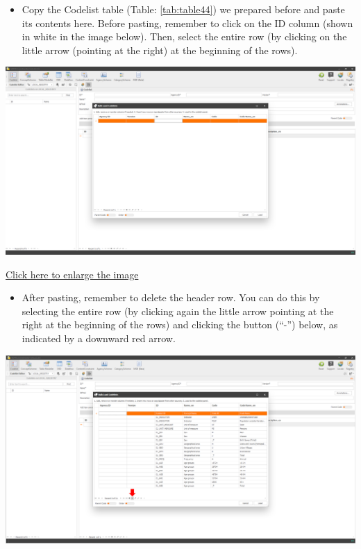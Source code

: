 \documentclass[
]{book}
\providecommand{\tightlist}{%
  \setlength{\itemsep}{0pt}\setlength{\parskip}{0pt}}
\begin{document}
\begin{itemize}
\tightlist
\item
  Copy the Codelist table (Table: \ref{tab:table44}) we prepared before and paste its contents here. Before pasting, remember to click on the ID column (shown in white in the image below). Then, select the entire row (by clicking on the little arrow (pointing at the right) at the beginning of the rows).
\end{itemize}

\begin{center}\includegraphics[width=1\linewidth]{./images/image088} \end{center}

\href{images/image088.png}{Click here to enlarge the image}

\begin{itemize}
\tightlist
\item
  After pasting, remember to delete the header row. You can do this by selecting the entire row (by clicking again the little arrow pointing at the right at the beginning of the rows) and clicking the button (``-'') below, as indicated by a downward red arrow.
\end{itemize}

\begin{center}\includegraphics[width=1\linewidth]{./images/image090} \end{center}
\end{document}
